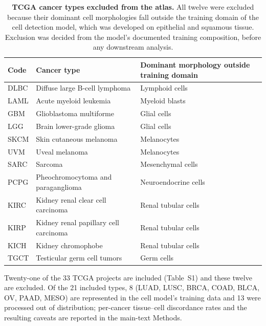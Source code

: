 \documentclass[11pt]{article}
\begin{document}
\begin{table}[htbp]
\centering
\caption{\textbf{TCGA cancer types excluded from the atlas.} All twelve were
excluded because their dominant cell morphologies fall outside the training
domain of the cell detection model, which was developed on epithelial and
squamous tissue. Exclusion was decided from the model's documented training
composition, before any downstream analysis.}
\label{tab:s2}
\small
\begin{tabular}{lll}
\toprule
Code & Cancer type & Dominant morphology outside training domain \\
\midrule
DLBC & Diffuse large B-cell lymphoma & Lymphoid cells \\
LAML & Acute myeloid leukemia & Myeloid blasts \\
GBM  & Glioblastoma multiforme & Glial cells \\
LGG  & Brain lower-grade glioma & Glial cells \\
SKCM & Skin cutaneous melanoma & Melanocytes \\
UVM  & Uveal melanoma & Melanocytes \\
SARC & Sarcoma & Mesenchymal cells \\
PCPG & Pheochromocytoma and paraganglioma & Neuroendocrine cells \\
KIRC & Kidney renal clear cell carcinoma & Renal tubular cells \\
KIRP & Kidney renal papillary cell carcinoma & Renal tubular cells \\
KICH & Kidney chromophobe & Renal tubular cells \\
TGCT & Testicular germ cell tumors & Germ cells \\
\bottomrule
\end{tabular}
\par\vspace{0.4em}
\parbox{0.92\textwidth}{\footnotesize Twenty-one of the 33 TCGA projects are
included (Table~S1) and these twelve are excluded. Of the 21
included types, 8 (LUAD, LUSC, BRCA, COAD, BLCA, OV, PAAD, MESO) are represented
in the cell model's training data and 13 were processed out of distribution;
per-cancer tissue--cell discordance rates and the resulting caveats are reported
in the main-text Methods.}
\end{table}
\end{document}

